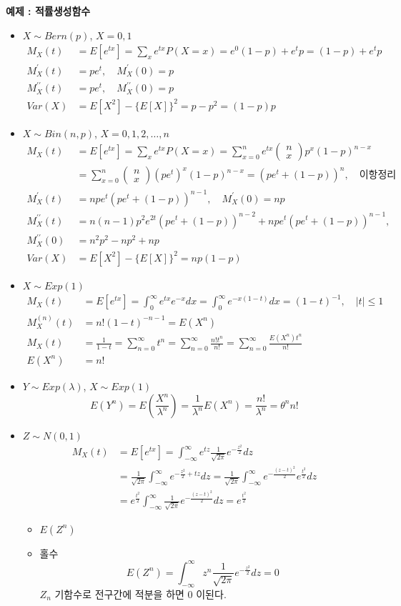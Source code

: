 \documentclass{oblivoir}
\newcommand{\mat}[2]{\begin{pmatrix} #1 \\ #2 \end{pmatrix}}
\begin{document}
\textbf{예제 : 적률생성함수}
\begin{itemize}
\item $X \sim Bern(p)$, $X = 0,1$
\begin{align*}
M_X(t) &= E[e^{tx}] = \sum_x e^{tx} P(X = x) = e^0 (1-p) + e^t p = (1-p) + e^t p \\
M_X^{\prime}(t) &= pe^t, \quad M_X^{\prime}(0) = p \\
M_X^{\prime\prime}(t) &= pe^t, \quad M_X^{\prime\prime}(0) = p \\
Var(X) &= E[X^2] - \{ E[X] \}^2 = p - p^2 = (1-p)p
\end{align*}
\item $X \sim Bin(n,p)$, $X = 0,1,2,\ldots, n$
\begin{align*}
M_X(t) &= E[e^{tx}] = \sum_x e^{tx} P(X = x) = \sum_{x=0}^n e^{tx} \mat{n}{x} p^x (1-p)^{n-x}\\
&= \sum_{x=0}^n \mat{n}{x} (pe^t)^x (1-p)^{n-x} = (pe^t + (1-p))^n, \quad \mbox{이항정리}\\
M_X^{\prime}(t) &= npe^t(pe^t + (1-p))^{n-1}, \quad M_X^{\prime}(0) = np \\
M_X^{\prime\prime}(t) &= n(n-1)p^2e^{2t}(pe^t + (1-p))^{n-2} + npe^t(pe^t + (1-p))^{n-1}, \\
 M_X^{\prime\prime}(0) &= n^2p^2 - np^2 + np \\
Var(X) &= E[X^2] - \{ E[X] \}^2 = np(1-p)
\end{align*}
\item$X \sim Exp(1)$
\begin{align*}
M_X(t) &= E[e^{tx}] = \int_0^{\infty} e^{tx} e^{-x} dx = \int_0^{\infty} e^{-x(1-t)}dx  = (1-t)^{-1}, \quad |t| \leq 1\\
M_X^{(n)}(t) &= n!(1-t)^{-n-1} = E(X^n)\\
M_X(t) &= \frac{1}{1-t} = \sum_{n=0}^{\infty} t^n = \sum_{n=0}^{\infty} \frac{n!t^n}{n!} = \sum_{n=0}^{\infty} \frac{E(X^n)t^n}{n!} \\
E(X^n) &= n! 
\end{align*}
\item $Y \sim Exp(\lambda)$, $X \sim Exp(1)$
$$
E(Y^n) = E\left(\frac{X^n}{\lambda^n} \right) = \frac{1}{\lambda^n} E(X^n) = \frac{n!}{\lambda^n} = \theta^n n!
$$
\item $Z \sim N(0,1)$
\begin{align*}
M_X(t) &= E[e^{tx}] = \int_{-\infty}^{\infty} e^{tz} \frac{1}{\sqrt{2\pi}} e^{- \frac{z^2}{2}} dz \\
&= \frac{1}{\sqrt{2\pi}} \int_{-\infty}^{\infty} e^{-\frac{z^2}{2} + tz} dz 
=  \frac{1}{\sqrt{2\pi}} \int_{-\infty}^{\infty} e^{-\frac{(z-t)^2}{2}} e^{\frac{t^2}{2}} dz \\
&= e^{\frac{t^2}{2}}  \int_{-\infty}^{\infty} \frac{1}{\sqrt{2\pi}} e^{-\frac{(z-t)^2}{2}} dz = e^{\frac{t^2}{2}}
\end{align*}
\begin{itemize}
\item $E(Z^n)$
\item 홀수
$$
E(Z^n) = \int_{-\infty}^{\infty} z^n \frac{1}{\sqrt{2\pi}} e^{-\frac{z^2}{2}} dz = 0
$$
$Z_n$ 기함수로 전구간에 적분을 하면 0 이된다. 


\end{itemize}
\end{itemize}
\end{document}
